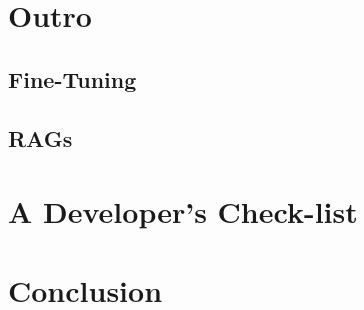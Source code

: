 \section{Outro}

\subsection{Fine-Tuning}
\subsection{RAGs}

\section{A Developer's Check-list}

\section{Conclusion}